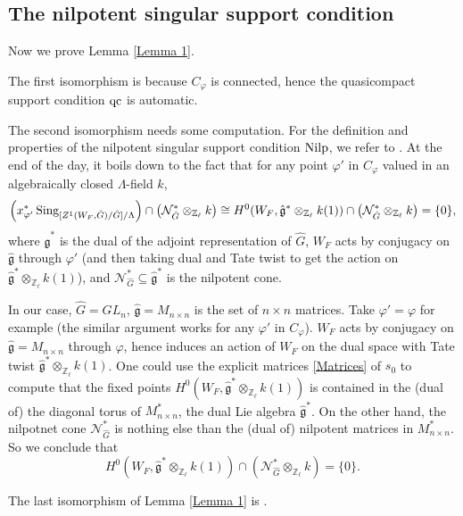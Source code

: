 \subsection{The nilpotent singular support condition} \label{Subsection Nilp}
Now we prove Lemma \ref{Lemma 1}. 

The first isomorphism is because $C_{\varphi}$ is connected, hence the quasicompact support condition $\operatorname{\operatorname{qc}}$ is automatic. 

The second isomorphism needs some computation. For the definition and properties of the nilpotent singular support condition $\operatorname{\operatorname{Nilp}}$, we refer to \cite[Section VIII.2]{fargues2021geometrization}. At the end of the day, it boils down to the fact that for any point $\varphi'$ in $C_{\varphi}$ valued in an algebraically closed $\Lambda$-field $k$,
$$\left(x_{\varphi'}^*\operatorname{\operatorname{Sing}}_{[Z^1(W_F, \hat{G})/\hat{G}]/\Lambda}\right)\cap \left(\mathcal{N}_{\hat{G}}^*\otimes _{\mathbb{Z}_{\ell}}k\right) \cong H^0(W_F, \hat{\mathfrak{g}}^*\otimes_{\mathbb{Z}_{\ell}}k(1)) \cap \left(\mathcal{N}_{\hat{G}}^*\otimes _{\mathbb{Z}_{\ell}}k\right)=\{0\},$$
where $\hat{\mathfrak{g}}^*$ is the dual of the adjoint representation of $\hat{G}$, $W_F$ acts by conjugacy on $\hat{\mathfrak{g}}$ through $\varphi'$ (and then taking dual and Tate twist to get the action on $\hat{\mathfrak{g}}^*\otimes_{\mathbb{Z}_{\ell}}k(1)$), and $\mathcal{N}_{\hat{G}}^* \subseteq \hat{\mathfrak{g}}^*$ is the nilpotent cone.

In our case, $\hat{G}=GL_n$, $\hat{\mathfrak{g}}=M_{n\times n}$ is the set of $n \times n$ matrices. Take $\varphi'=\varphi$ for example (the similar argument works for any $\varphi'$ in $C_{\varphi}$). $W_F$ acts by conjugacy on $\hat{\mathfrak{g}}=M_{n\times n}$ through $\varphi$, hence induces an action of $W_F$ on the dual space with Tate twist $\hat{\mathfrak{g}}^*\otimes_{\mathbb{Z}_{\ell}}k(1)$. One could use the explicit matrices \ref{Matrices} of $s_0$ to compute that the fixed points $H^0(W_F, \hat{\mathfrak{g}}^*\otimes_{\mathbb{Z}_{\ell}}k(1))$ is contained in the (dual of) the diagonal torus of $M_{n\times n}^*$, the dual Lie algebra $\hat{\mathfrak{g}}^*$. On the other hand, the nilpotnet cone $\mathcal{N}_{\hat{G}}^*$ is nothing else than the (dual of) nilpotent matrices in $M_{n\times n}^*$. So we conclude that 
$$H^0(W_F, \hat{\mathfrak{g}}^*\otimes_{\mathbb{Z}_{\ell}}k(1)) \cap \left(\mathcal{N}_{\hat{G}}^*\otimes _{\mathbb{Z}_{\ell}}k\right)=\{0\}.$$

The last isomorphism of Lemma \ref{Lemma 1} is \cite[Theorem VIII.2.9]{fargues2021geometrization}.


